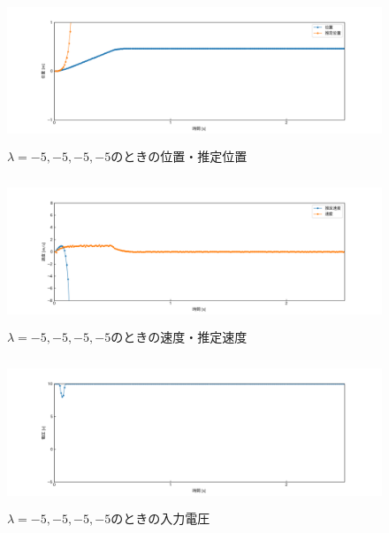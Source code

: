 \documentclass[12pt]{jsarticle}
\begin{document}
\begin{figure}[H]
  \begin{center}
    \includegraphics[clip,width=13.0cm, height=4.4cm]{../img/Exp9-1.png}
    \caption{$\lambda=-5, -5, -5, -5$のときの位置・推定位置}
    \label{Exp9-1}
  \end{center}
\end{figure}
\begin{figure}[H]
  \begin{center}
    \includegraphics[clip,width=13.0cm, height=4.4cm]{../img/Exp9-2.png}
    \caption{$\lambda=-5, -5, -5, -5$のときの速度・推定速度}
    \label{Exp9-2}
  \end{center}
\end{figure}
\begin{figure}[H]
  \begin{center}
    \includegraphics[clip,width=13.0cm, height=4.4cm]{../img/Exp9-3.png}
    \caption{$\lambda=-5, -5, -5, -5$のときの入力電圧}
    \label{Exp9-3}
  \end{center}
\end{figure}
\end{document}

